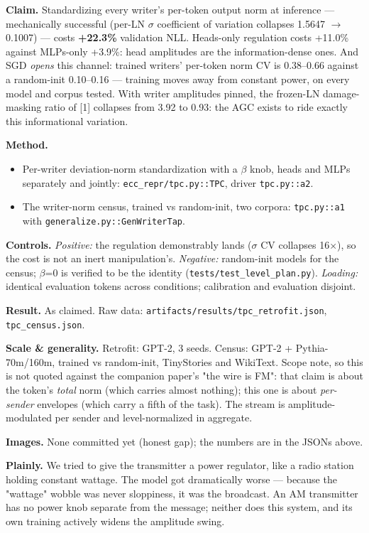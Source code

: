 \documentclass[10pt]{article}
\begin{document}
\textbf{Claim.} Standardizing every writer's per-token output norm at inference --- mechanically
successful (per-LN $\sigma$ coefficient of variation collapses 1.5647 $\to$ 0.1007) --- costs \textbf{+22.3\%}
validation NLL. Heads-only regulation costs +11.0\% against MLPs-only +3.9\%: head amplitudes are
the information-dense ones. And SGD \emph{opens} this channel: trained writers' per-token norm CV is
0.38--0.66 against a random-init 0.10--0.16 --- training moves away from constant power, on every
model and corpus tested. With writer amplitudes pinned, the frozen-LN damage-masking ratio of [1]
collapses from 3.92 to 0.93: the AGC exists to ride exactly this informational variation.

\textbf{Method.}
\begin{itemize}\setlength\itemsep{1pt}
\item Per-writer deviation-norm standardization with a $\beta$ knob, heads and MLPs separately and jointly: \texttt{ecc\_repr/tpc.py::TPC}, driver \texttt{tpc.py::a2}.
\item The writer-norm census, trained vs random-init, two corpora: \texttt{tpc.py::a1} with \texttt{generalize.py::GenWriterTap}.
\end{itemize}
\textbf{Controls.} \emph{Positive:} the regulation demonstrably lands ($\sigma$ CV collapses 16$\times$), so the cost is
not an inert manipulation's. \emph{Negative:} random-init models for the census; $\beta$=0 is verified to be
the identity (\texttt{tests/test\_level\_plan.py}). \emph{Loading:} identical evaluation tokens across
conditions; calibration and evaluation disjoint.

\textbf{Result.} As claimed. Raw data: \texttt{artifacts/results/tpc\_retrofit.json}, \texttt{tpc\_census.json}.

\textbf{Scale \& generality.} Retrofit: GPT-2, 3 seeds. Census: GPT-2 + Pythia-70m/160m, trained vs
random-init, TinyStories and WikiText. Scope note, so this is not quoted against the companion
paper's "the wire is FM": that claim is about the token's \emph{total} norm (which carries almost
nothing); this one is about \emph{per-sender} envelopes (which carry a fifth of the task). The stream is
amplitude-modulated per sender and level-normalized in aggregate.

\textbf{Images.} None committed yet (honest gap); the numbers are in the JSONs above.

\textbf{Plainly.} We tried to give the transmitter a power regulator, like a radio station holding
constant wattage. The model got dramatically worse --- because the "wattage" wobble was never
sloppiness, it was the broadcast. An AM transmitter has no power knob separate from the message;
neither does this system, and its own training actively widens the amplitude swing.
\end{document}
